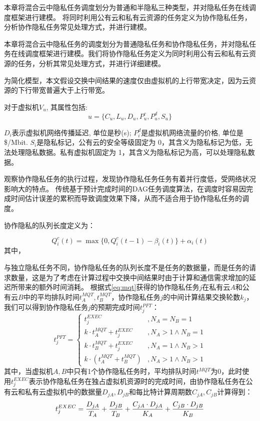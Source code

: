 本章将混合云中隐私任务调度划分为普通和半隐私三种类型，并对隐私任务在线调度框架进行建模。
将同时利用公有云和私有云资源的任务定义为协作隐私任务，分析协作隐私任务常见处理方式，并进行建模。

本章将混合云中隐私任务的调度划分为普通隐私任务和协作隐私任务，并对隐私任务在线调度框架进行建模。我们将协作隐私任务定义为同时利用公有云和私有云资源的任务，分析其常见处理方式，并进行详细建模。

为简化模型，本文假设交换中间结果的速度仅由虚拟机的上行带宽决定，因为云资源的下行带宽普遍大于上行带宽。

对于虚拟机\(V_u\), 其属性包括: \[
    u = \{C_u, L_u, D_u, P^c_u, P^d_u, S_u\}
\]

\(D_i\)表示虚拟机网络传播延迟, 单位是秒(s);
\(P^d_i\)是虚拟机网络流量的价格, 单位是\$/Mbit.
\(S_i\)是隐私标记，公有云的安全等级固定为
0，其含义为隐私标记为低，无法处理隐私数据。私有虚拟机固定为
1，其含义为隐私标记为高，可以处理隐私数据。

观察协作隐私任务的执行过程，发现协作隐私任务任务有着并行度低，受网络状况影响大的特点。
传统基于预计完成时间的DAG任务调度算法，在调度时容易因完成时间估计误差的累积而导致调度效果下降，从而不适合用于协作隐私任务的调度。

协作隐私的队列长度定义为：

\begin{equation}
    Q_i^c(t) = \max \{0, Q_i^c(t-1) - \beta_i(t) \} + \alpha_i(t)
\end{equation}
其中，

与独立隐私任务不同，协作隐私任务的队列长度不是任务的数据量，而是任务的请求数量，这是为了考虑在计算过程中交换中间结果时由于计算和通信需求增加的延迟所带来的额外时间消耗。
根据式\eqref{eq:mqt}获得的协作隐私任务\(j\)在私有云\(A\)和公有云\(B\)中的平均排队时间\(t^{MQT}_A, t^{MQT}_B\)，协作隐私任务\(j\)的中间计算结果交换轮数\(k_j\)，我们可以得到协作隐私任务\(j\)的预期完成时间\(t^{PFT}_j\)：
\begin{equation}
    t^{PFT}_j =
    \begin{cases}
        t^{EXEC}_j                      & , N_A = N_B = 1         \\
        k \cdot t^{MQT}_A + t^{EXEC}_j  & , N_A > 1 \land N_B = 1 \\
        k \cdot t^{MQT}_B + t^{EXEC}_j  & , N_A = 1 \land N_B > 1 \\
        k \cdot (t^{MQT}_A + t^{MQT}_B) & , N_A > 1 \land N_B > 1
    \end{cases}
    \label{eq:semi-eft}
\end{equation}
其中，当虚拟机\(A, B\)中只有1个协作隐私任务时，平均排队时间\(t^{MQT}\)为0，此时使用\(t^{EXEC}_j\)表示协作隐私任务在独占虚拟机资源时的完成时间，由协作隐私任务在公有云和私有云虚拟机中的数据量\(D_{jA}, D_{jB}\)和每比特计算周期数\(C_{jA}, C_{jB}\)计算得到：
\[
    t^{EXEC}_j = \frac{D_{jA}}{T_A}\\
    +\frac{D_{jB}}{T_B}\\
    +\frac{C_{jA}\cdot D_{jA}}{K_A}\\
    +\frac{C_{jB}\cdot D_{jB}}{K_B}
\]

